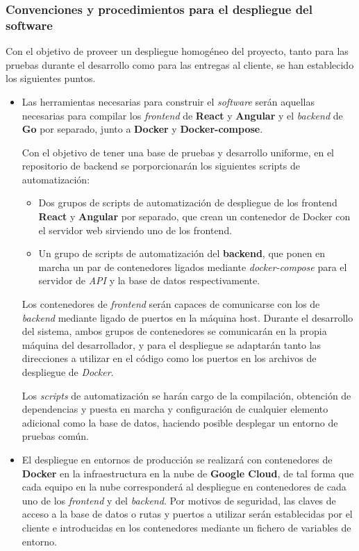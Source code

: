 \documentclass[11pt, a4paper, titlepage]{article}
\begin{document}
\subsubsection{Convenciones y procedimientos para el despliegue del software}

Con el objetivo de proveer un despliegue homogéneo del proyecto, tanto para las pruebas durante el desarrollo como para las entregas al cliente, se han establecido los siguientes puntos.

\begin{itemize}
    \item Las herramientas necesarias para construir el \textit{software} serán aquellas necesarias para compilar los \textit{frontend} de \textbf{React} y \textbf{Angular} y el \textit{backend} de \textbf{Go} por separado, junto a \textbf{Docker} y \textbf{Docker-compose}. \newline

    Con el objetivo de tener una base de pruebas y desarrollo uniforme, en el repositorio de backend se porporcionarán los siguientes scripts de automatización:
    \begin{itemize}
        \item Dos grupos de scripts de automatización de despliegue de los frontend \textbf{React} y \textbf{Angular} por separado, que crean un contenedor de Docker con el servidor web sirviendo uno de los frontend.

        \item Un grupo de scripts de automatización del \textbf{backend}, que ponen en marcha un par de contenedores ligados mediante \textit{docker-compose} para el servidor de \textit{API} y la base de datos respectivamente.
    \end{itemize}

    Los contenedores de \textit{frontend} serán capaces de comunicarse con los de \textit{backend} mediante ligado de puertos en la máquina host. Durante el desarrollo del sistema, ambos grupos de contenedores se comunicarán en la propia máquina del desarrollador, y para el despliegue se adaptarán tanto las direcciones a utilizar en el código como los puertos en los archivos de despliegue de \textit{Docker}.

    Los \textit{scripts} de automatización se harán cargo de la compilación, obtención de dependencias y puesta en marcha y configuración de cualquier elemento adicional como la base de datos, haciendo posible desplegar un entorno de pruebas común.

    \item El despliegue en entornos de producción se realizará con contenedores de \textbf{Docker} en la infraestructura en la nube de \textbf{Google Cloud}, de tal forma que cada equipo en la nube corresponderá al despliegue en contenedores de cada uno de los \textit{frontend} y del \textit{backend}. Por motivos de seguridad, las claves de acceso a la base de datos o rutas y puertos a utilizar serán establecidas por el cliente e introducidas en los contenedores mediante un fichero de variables de entorno.
\end{itemize}
\end{document}
